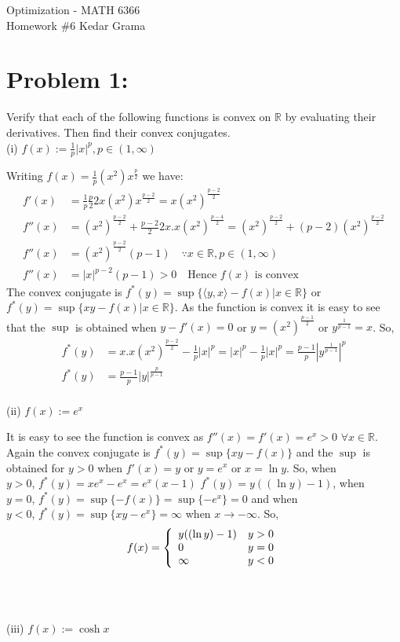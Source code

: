 \documentclass[12pt]{report}
\begin{document}
\begin{center}
	\large{Optimization - MATH 6366}\\
	\hfill \hfill \large{Homework \#6} \hfill \large{Kedar Grama}\\
\end{center}

\section*{Problem 1:}
Verify that each of the following functions is convex on $\mathbb{R}$ by evaluating their derivatives. Then find their convex
conjugates.\\
(i) $f(x):=\frac{1}{p} |x|^p, p\in(1,\infty)$

Writing $f(x)=\frac{1}{p} (x^2)x^{\frac{p}{2}}$ we have:
\begin{align*}
f'(x) &=\frac{1}{p}\frac{p}{2}2x (x^2)x^{\frac{p-2}{2}} = x(x^2)^{\frac{p-2}{2}} \\
f''(x)&= (x^2)^{\frac{p-2}{2}} + \frac{p-2}{2}2x.x(x^2)^{\frac{p-4}{2}} = (x^2)^{\frac{p-2}{2}}+(p-2)(x^2)^{\frac{p-2}{2}} \\
f''(x)&=(x^2)^{\frac{p-2}{2}}(p-1) \quad \because x\in\mathbb{R}, p\in(1,\infty) \\
f''(x)&=|x|^{p-2}(p-1) > 0 \quad \text{Hence $f(x)$ is convex}
\end{align*}
The convex conjugate is $f^*(y)=\sup\{\langle y,x \rangle -f(x)|x\in\mathbb{R}\}$ or \\$f^*(y)=\sup\{xy-f(x)|x\in\mathbb{R}\}$.
As the function is convex it is easy to see that the $\sup $ is obtained when $y-f'(x)=0$ or
$y=(x^2)^{\frac{p-1}{2}}$ or $y^{\frac{1}{p-1}}=x$. So,
\begin{align*}
f^*(y) &= x.x(x^2)^{\frac{p-2}{2}}-\frac{1}{p} |x|^p = |x|^p - \frac{1}{p} |x|^p = \frac{p-1}{p}|y^{\frac{1}{p-1}}|^p \\
f^*(y) &= \frac{p-1}{p}|y|^{\frac{p}{p-1}}
\end{align*}
\\
(ii) $f(x):=e^x$ 

It is easy to see the function is convex as $f''(x)=f'(x)=e^x>0$ $\forall x\in \mathbb{R}$. Again the convex conjugate is
$f^*(y)=\sup\{xy-f(x)\}$ and the $\sup$ is obtained for $y>0$ when $f'(x)=y$ or $y=e^x$ or $x=\ln y$. So, when \\
$y>0$, $f^*(y)= xe^x -e^x = e^x(x-1)$ $f^*(y)= y((\ln y)-1)$, when \\ $y=0$, $f^*(y)=\sup\{-f(x)\}=\sup\{-e^x\}=0$ and when \\
$y<0$, $f^*(y)=\sup\{xy-e^x\}=\infty$ when $x\to -\infty$. So,
\begin{equation*}
f(x)=\left\{
\begin{array}{l l}
y((\ln y)-1) & y>0 \\
0 & y=0 \\
\infty & y<0
\end{array}
\right.
\end{equation*}
\\
\\
\\
(iii) $f(x):=\cosh x$
\end{document}
